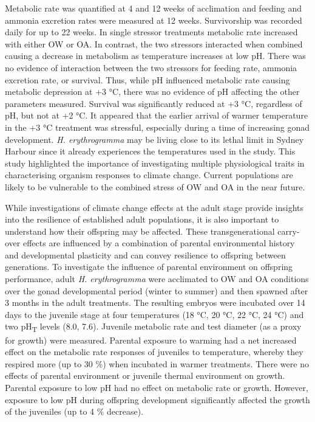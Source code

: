 \documentclass[a4paper,10pt, oneside]{memoir}
\begin{document}
Metabolic rate was quantified at 4 and 12 weeks of acclimation and feeding and ammonia excretion rates were measured at 12 weeks.
Survivorship was recorded daily for up to 22 weeks.
In single stressor treatments metabolic rate increased with either OW or OA.
In contrast, the two stressors interacted when combined causing a decrease in metabolism as temperature increases at low pH.
There was no evidence of interaction between the two stressors for feeding rate, ammonia excretion rate, or survival.
Thus, while pH influenced metabolic rate causing metabolic depression at +3 °C, there was no evidence of pH affecting the other parameters measured.
Survival was significantly reduced at +3 °C, regardless of pH, but not at +2 °C.
It appeared that the earlier arrival of warmer temperature in the +3 °C treatment was stressful, especially during a time of increasing gonad development.
\emph{H. erythrogramma} may be living close to its lethal limit in Sydney Harbour since it already experiences the temperatures used in the study.
This study highlighted the importance of investigating multiple physiological traits in characterising organism responses to climate change.
Current populations are likely to be vulnerable to the combined stress of OW and OA in the near future.

While investigations of climate change effects at the adult stage provide insights into the resilience of established adult populations, it is also important to understand how their offspring may be affected.
These transgenerational carry-over effects are influenced by a combination of parental environmental history and developmental plasticity and can convey resilience to offspring between generations.
To investigate the influence of parental environment on offspring performance, adult \emph{H. erythrogramma} were acclimated to OW and OA conditions over the gonad developmental period (winter to summer) and then spawned after 3 months in the adult treatments.
The resulting embryos were incubated over 14 days to the juvenile stage at four temperatures (18 °C, 20 °C, 22 °C, 24 °C) and two pH\textsubscript{T} levels (8.0, 7.6).
Juvenile metabolic rate and test diameter (as a proxy for growth) were measured.
Parental exposure to warming had a net increased effect on the metabolic rate responses of juveniles to temperature, whereby they respired more (up to 30 \%) when incubated in warmer treatments.
There were no effects of parental environment or juvenile thermal environment on growth.
Parental exposure to low pH had no effect on metabolic rate or growth.
However, exposure to low pH during offspring development significantly affected the growth of the juveniles (up to 4 \% decrease).
\end{document}

